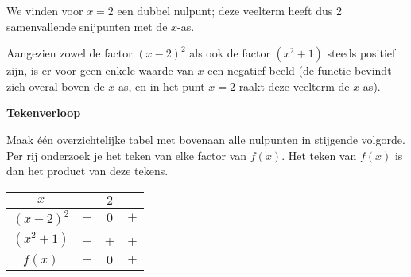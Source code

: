 \begin{voorbeeld}
We vinden voor $x=2$ een dubbel nulpunt; deze veelterm
heeft dus 2 samenvallende snijpunten met de $x$-as.

Aangezien zowel de factor $(x-2)^{2}$ als ook de factor
$(x^{2}+1)$ steeds positief zijn, is er voor geen enkele waarde van
$x$ een negatief beeld (de functie bevindt zich overal boven de $x$-as,
en in het punt $x=2$ raakt deze veelterm de $x$-as).



\begin{figure}[H]
	\centering 
	 
\end{figure}


\textbf{Tekenverloop}

Maak \'e\'en overzichtelijke tabel met bovenaan alle nulpunten
in stijgende volgorde. Per rij onderzoek je het teken van elke factor
van $f(x)$. Het teken van $f(x)$ is dan het product van deze tekens.

\begin{center}
\begin{tabular}{c||ccc}
$x$ &  & $2$ & \\
\hline 
$(x-2)^{2}$ & $+$ & $0$ & \multicolumn{1}{c}{$+$}\\
$(x^{2}+1)$ & +&+&+\\
\hline 
$f(x)$ & $+$ & $0$ & $+$\\
\end{tabular}
\par\end{center}

\end{voorbeeld}